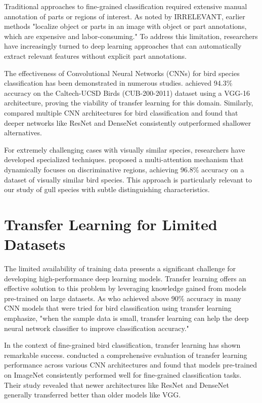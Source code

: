 \documentclass[a4paper,12pt]{article}
\begin{document}
Traditional approaches to fine-grained classification required extensive manual annotation of parts or regions of interest. As noted by \citep{zhang2022unsupervised} IRRELEVANT, earlier methods "localize object or parts in an image with object or part annotations, which are expensive and labor-consuming." To address this limitation, researchers have increasingly turned to deep learning approaches that can automatically extract relevant features without explicit part annotations.

The effectiveness of Convolutional Neural Networks (CNNs) for bird species classification has been demonstrated in numerous studies. \citep{zhang2019bird} achieved 94.3\% accuracy on the Caltech-UCSD Birds (CUB-200-2011) dataset using a VGG-16 architecture, proving the viability of transfer learning for this domain. Similarly, \citep{marini2018bird} compared multiple CNN architectures for bird classification and found that deeper networks like ResNet and DenseNet consistently outperformed shallower alternatives.

For extremely challenging cases with visually similar species, researchers have developed specialized techniques. \citep{he2022bird} proposed a multi-attention mechanism that dynamically focuses on discriminative regions, achieving 96.8\% accuracy on a dataset of visually similar bird species. This approach is particularly relevant to our study of gull species with subtle distinguishing characteristics.

\section*{Transfer Learning for Limited Datasets}
The limited availability of training data presents a significant challenge for developing high-performance deep learning models. Transfer learning offers an effective solution to this problem by leveraging knowledge gained from models pre-trained on large datasets. As \citep{tan2018survey} who achieved above 90\% accuracy in many CNN models that were tried for bird classification using transfer learning emphasize, "when the sample data is small, transfer learning can help the deep neural network classifier to improve classification accuracy."

In the context of fine-grained bird classification, transfer learning has shown remarkable success. \citep{kornblith2019better} conducted a comprehensive evaluation of transfer learning performance across various CNN architectures and found that models pre-trained on ImageNet consistently performed well for fine-grained classification tasks. Their study revealed that newer architectures like ResNet and DenseNet generally transferred better than older models like VGG.
\end{document}
